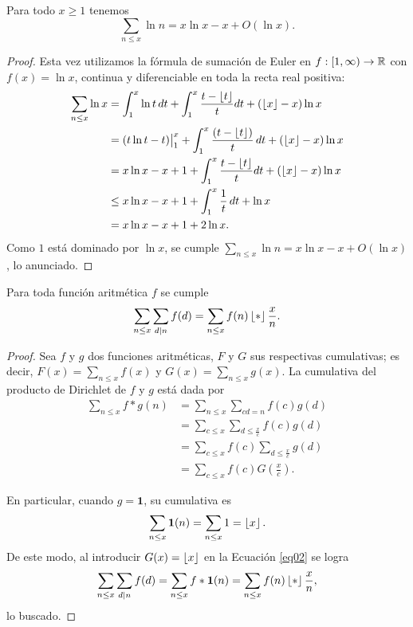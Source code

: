\begin{lemma}\label{lem09}
Para todo $x \geq 1$ tenemos
\[
\sum_{n \leq x} \ln n = x\ln x - x + O(\ln x).
\]
\end{lemma}

\begin{proof}
Esta vez utilizamos la f\'ormula de sumaci\'on de Euler en $f : [1, \infty) \to \mathbb{R}$ con $f(x) = \ln x$, continua y diferenciable en toda la recta real positiva:  
\begin{align}
\sum_{n \leq x} \ln x &= \int_1^x \ln t \, dt + \int_1^x  \frac{t - \left\lfloor t \right\rfloor}{t} dt + (\left\lfloor x \right\rfloor - x) \ln x  \\
&= (t \ln t - t) \big|_1^x + \int_1^x \frac{(t - \left\lfloor t \right\rfloor)}{t} \, dt + (\left\lfloor x \right\rfloor - x) \ln x \\
&= x \ln x - x + 1 + \int_1^x \frac{t - \left\lfloor t \right\rfloor}{t} dt + (\left\lfloor x \right\rfloor - x) \ln x \\
&\leq x \ln x - x + 1 + \int_1^x \frac{1}{t} \,dt + \ln x \\
&= x \ln x - x + 1 + 2 \ln x.
\end{align}
Como $1$ est\'a dominado por $\ln x$,  
se cumple $\sum_{n \leq x} \ln n = x\ln x - x + O(\ln x)$, 
lo anunciado. 
\end{proof}

\begin{lemma}\label{lem10}
Para toda funci\'on aritm\'etica $f$ se cumple
\[
\sum_{n \leq x} \sum_{d \mid n} f(d) = \sum_{n \leq x} f(n) \left\lfloor * \right\rfloor{\frac{x}{n}}.
\]
\end{lemma}

\begin{proof}
Sea $f$ y $g$ dos funciones aritm\'eticas, $F$ y $G$ sus respectivas cumulativas;
es decir, $F(x) = \sum_{n \leq x} f(x)$ y $G(x) = \sum_{n \leq x} g(x)$. 
La cumulativa del producto de Dirichlet de $f$ y $g$ est\'a dada por 
\begin{align}
\sum_{n \leq x} f * g (n) &= \sum_{n \leq x} \sum_{cd = n} f(c)g(d)\\
&= \sum_{c \leq x} \sum_{d \leq \frac{x}{c}} f(c) g(d)\\
&= \sum_{c \leq x} f(c) \sum_{d \leq \frac{x}{c}} g(d)\\
&= \sum_{c \leq x} f(c) G\left(\frac{x}{c}\right).\label{eq02}
\end{align}

En particular, cuando $g = \mathbf{1}$, su cumulativa es
\begin{align}
\sum_{n \leq x} \mathbf{1}(n) = \sum_{n \leq x} 1 = \left\lfloor x \right\rfloor.
\end{align}
De este modo, al introducir $G(x)=\left\lfloor x \right\rfloor$ en la Ecuaci\'on \ref{eq02} se logra 
\begin{align}
\sum_{n \leq x} \sum_{d \mid n} f(d) = \sum_{n \leq x} f * \mathbf{1} (n) = \sum_{n \leq x} f(n) \left\lfloor * \right\rfloor{\frac{x}{n}}, 
\end{align}
lo buscado. 
\end{proof}

